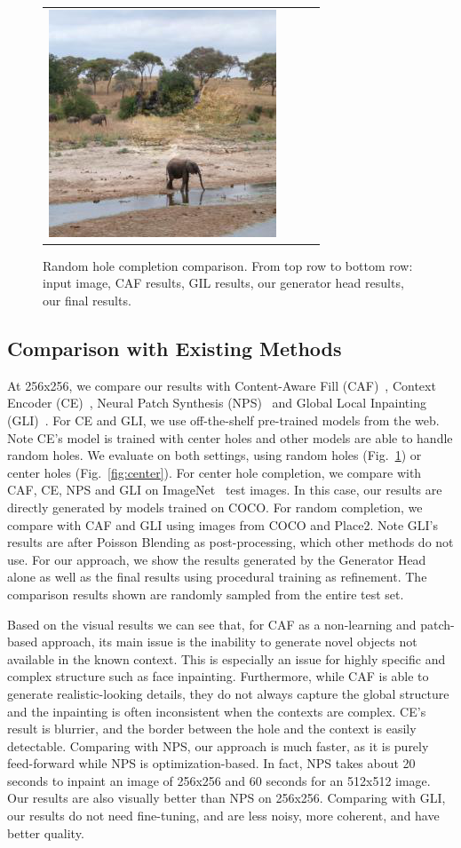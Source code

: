 \begin{figure}[H]
\begin{tabular}{cccc}
\includegraphics[width=.24\textwidth]{figures/random/000000286994.png} \\
\end{tabular}
\caption{Random hole completion comparison. From top row to bottom row: input image, CAF results, GIL results, our generator head results, our final results.}
\label{fig:random}
\vspace{-10pt}
\end{figure}

\subsection{Comparison with Existing Methods}
\label{exp:comparison}
At 256x256, we compare our results with Content-Aware Fill (CAF)~\cite{barnes2009patchmatch}, Context Encoder (CE)~\cite{pathak2016context}, Neural Patch Synthesis (NPS)~\cite{yang2017high} and Global Local Inpainting (GLI)~\cite{iizuka2017globally}. For CE and GLI, we use off-the-shelf pre-trained models from the web. Note CE's model is trained with center holes and other models are able to handle random holes. We evaluate on both settings, using random holes (Fig.~\ref{fig:random}) or center holes (Fig.~\ref{fig:center}). For center hole completion, we compare with CAF, CE, NPS and GLI on ImageNet~\cite{russakovsky2015imagenet} test images. In this case, our results are directly generated by models trained on COCO. For random completion, we compare with CAF and GLI using images from COCO and Place2. Note GLI's results are after Poisson Blending as post-processing, which other methods do not use. For our approach, we show the results generated by the Generator Head alone as well as the final results using procedural training as refinement. The comparison results shown are randomly sampled from the entire test set. 

Based on the visual results we can see that, for CAF as a non-learning and patch-based approach, its main issue is the inability to generate novel objects not available in the known context. This is especially an issue for highly specific and complex structure such as face inpainting. Furthermore, while CAF is able to generate realistic-looking details, they do not always capture the global structure and the inpainting is often inconsistent when the contexts are complex. CE's result is blurrier, and the border between the hole and the context is easily detectable. Comparing with NPS, our approach is much faster, as it is purely feed-forward while NPS is optimization-based. In fact, NPS takes about 20 seconds to inpaint an image of 256x256 and 60 seconds for an 512x512 image. Our results are also visually better than NPS on 256x256. Comparing with GLI, our results do not need fine-tuning, and are less noisy, more coherent, and have better quality. 


